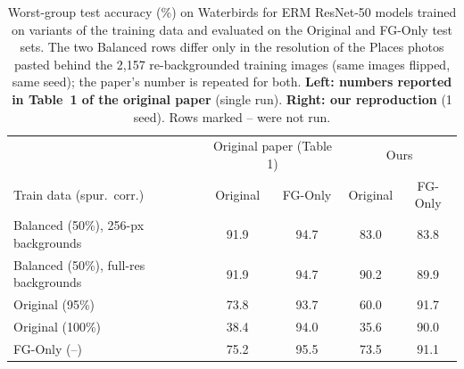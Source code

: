 \begin{table}[h]
\centering
\begin{tabular}{l cc cc}
\hline
 & \multicolumn{2}{c}{Original paper (Table 1)} & \multicolumn{2}{c}{Ours} \\
Train data (spur.\ corr.) & Original & FG-Only & Original & FG-Only \\
\hline
Balanced (50\%), 256-px backgrounds & 91.9 & 94.7 & 83.0 & 83.8 \\
Balanced (50\%), full-res backgrounds & 91.9 & 94.7 & 90.2 & 89.9 \\
Original (95\%) & 73.8 & 93.7 & 60.0 & 91.7 \\
Original (100\%) & 38.4 & 94.0 & 35.6 & 90.0 \\
FG-Only (--) & 75.2 & 95.5 & 73.5 & 91.1 \\
\hline
\end{tabular}
\caption{Worst-group test accuracy (\%) on Waterbirds for ERM ResNet-50 models trained on variants of the training data and evaluated on the Original and FG-Only test sets. The two Balanced rows differ only in the resolution of the Places photos pasted behind the 2,157 re-backgrounded training images (same images flipped, same seed); the paper's number is repeated for both. \textbf{Left: numbers reported in Table~1 of the original paper} (single run). \textbf{Right: our reproduction} (1 seed). Rows marked -- were not run.}
\label{tab:table1}
\end{table}
